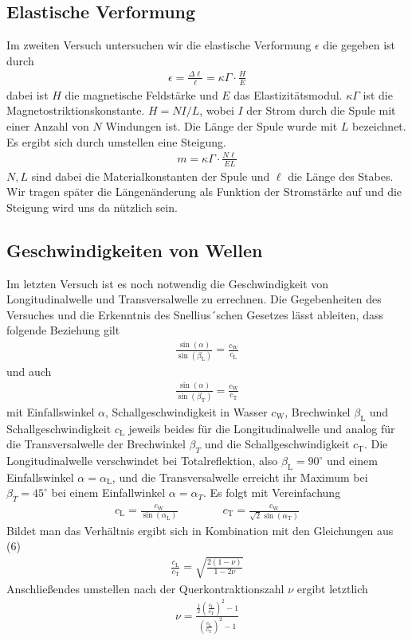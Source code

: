 \documentclass[a4paper, 12pt]{scrartcl}
\begin{document}
\subsection{Elastische Verformung}
Im zweiten Versuch untersuchen wir die elastische Verformung $\epsilon$ die gegeben ist durch 
\begin{align}
\epsilon = \frac{\Delta \ell}{\ell} = \kappa \Gamma \cdot \frac{H}{E}
\end{align}
dabei ist $H$ die magnetische Feldstärke und $E$ das Elastizitätsmodul. $\kappa \Gamma$ ist die Magnetostriktionskonstante. $H = NI /L$, wobei $I$ der Strom durch die Spule mit einer Anzahl von $N$ Windungen ist. Die Länge der Spule wurde mit $L$ bezeichnet. Es ergibt sich durch umstellen eine Steigung.
\begin{align}
m = \kappa \Gamma \cdot \frac{N \ell}{E L}
\end{align}
$N , L$ sind dabei die Materialkonstanten der Spule und $\ell$ die Länge des Stabes. Wir tragen später die Längenänderung als Funktion der Stromstärke auf und die Steigung wird uns da nützlich sein. 
\subsection{Geschwindigkeiten von Wellen}
Im letzten Versuch ist es noch notwendig die Geschwindigkeit von Longitudinalwelle und Transversalwelle zu errechnen. Die Gegebenheiten des Versuches und die Erkenntnis des Snellius´schen Gesetzes lässt ableiten, dass folgende Beziehung gilt
\begin{align}
\frac{\sin(\alpha)}{\sin(\beta_\textrm{L})} = \frac{c_\textrm{W}}{c_\textrm{L}}
\end{align}  
und auch 
\begin{align}
\frac{\sin(\alpha)}{\sin(\beta_\textrm{T})} = \frac{c_\textrm{W}}{c_\textrm{T}}
\end{align}
mit Einfallswinkel $\alpha$, Schallgeschwindigkeit in Wasser $c_\textrm{W}$, Brechwinkel $\beta_\textrm{L}$ und Schallgeschwindigkeit $c_\textrm{L}$ jeweils beides für die Longitudinalwelle und analog für die Transversalwelle der Brechwinkel $\beta_T$ und die Schallgeschwindigkeit $c_\textrm{T}$. Die Longitudinalwelle verschwindet bei Totalreflektion, also $\beta_\textrm{L}=90^\circ$ und einem Einfallswinkel $\alpha = \alpha_\textrm{L}$, und die Transversalwelle erreicht ihr Maximum bei $\beta_T = 45^\circ$ bei einem Einfallwinkel $\alpha = \alpha_T$. Es folgt mit Vereinfachung 
\begin{align}
c_\textrm{L} = \frac{c_\textrm{W}}{\sin(\alpha_\textrm{L})} \qquad \qquad c_\textrm{T} = \frac{c_\textrm{W}}{\sqrt{2} \sin(\alpha_\textrm{T})} 
\end{align} 
Bildet man das Verhältnis ergibt sich in Kombination mit den Gleichungen aus (6)
\begin{align}
\frac{c_\textrm{L}}{c_\textrm{T}} = \sqrt{\frac{2(1-\nu)}{1-2\nu}}
\end{align}
Anschließendes umstellen nach der Querkontraktionszahl $\nu$ ergibt letztlich 
\begin{align}
\nu = \frac{\frac{1}{2} \left( \frac{c_\textrm{L}}{c_\textrm{T}} \right)^2 -1 }{\left( \frac{c_\textrm{L}}{c_\textrm{T}} \right)^2-1}
\end{align}
\newpage
\end{document}
